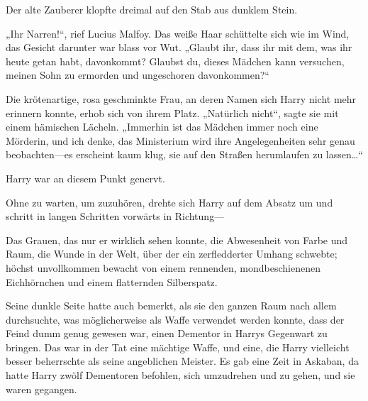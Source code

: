 Der alte Zauberer klopfte dreimal auf den Stab aus dunklem Stein.

„Ihr Narren!“, rief Lucius Malfoy.
Das weiße Haar schüttelte sich wie im Wind, das Gesicht darunter war blass vor Wut. „Glaubt ihr, dass ihr mit dem, was ihr heute getan habt, davonkommt? Glaubst du, dieses Mädchen kann versuchen, meinen Sohn zu ermorden und ungeschoren davonkommen?“

Die krötenartige, rosa geschminkte Frau, an deren Namen sich Harry nicht mehr erinnern konnte, erhob sich von ihrem Platz.
„Natürlich nicht“, sagte sie mit einem hämischen Lächeln. „Immerhin ist das Mädchen immer noch eine Mörderin, und ich denke, das Ministerium wird ihre Angelegenheiten sehr genau beobachten—es erscheint kaum klug, sie auf den Straßen herumlaufen zu lassen…“

Harry war an diesem Punkt genervt.

Ohne zu warten, um zuzuhören, drehte sich Harry auf dem Absatz um und schritt in langen Schritten vorwärts in Richtung—

Das Grauen, das nur er wirklich sehen konnte, die Abwesenheit von Farbe und Raum, die Wunde in der Welt, über der ein zerfledderter Umhang schwebte; höchst unvollkommen bewacht von einem rennenden, mondbeschienenen Eichhörnchen und einem flatternden Silberspatz.

Seine dunkle Seite hatte auch bemerkt, als sie den ganzen Raum nach allem durchsuchte, was möglicherweise als Waffe verwendet werden konnte, dass der Feind dumm genug gewesen war, einen Dementor in Harrys Gegenwart zu bringen. Das war in der Tat eine mächtige Waffe, und eine, die Harry vielleicht besser beherrschte als seine angeblichen Meister. Es gab eine Zeit in Askaban, da hatte Harry zwölf Dementoren befohlen, sich umzudrehen und zu gehen, und sie waren gegangen.

